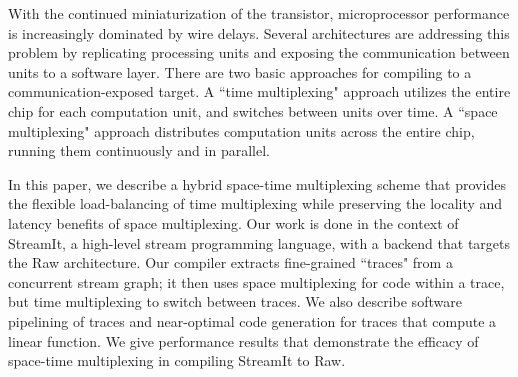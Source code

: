 With the continued miniaturization of the transistor, microprocessor
performance is increasingly dominated by wire delays.  Several
architectures are addressing this problem by replicating processing
units and exposing the communication between units to a software
layer.  There are two basic approaches for compiling to a
communication-exposed target.  A ``time multiplexing" approach utilizes
the entire chip for each computation unit, and switches between units
over time.  A ``space multiplexing" approach distributes computation
units across the entire chip, running them continuously and in
parallel.

In this paper, we describe a hybrid space-time multiplexing scheme
that provides the flexible load-balancing of time multiplexing while
preserving the locality and latency benefits of space multiplexing.
Our work is done in the context of StreamIt, a high-level stream
programming language, with a backend that targets the Raw
architecture.  Our compiler extracts fine-grained ``traces" from a
concurrent stream graph; it then uses space multiplexing for code
within a trace, but time multiplexing to switch between traces.  We
also describe software pipelining of traces and near-optimal code
generation for traces that compute a linear function.  We give
performance results that demonstrate the efficacy of space-time
multiplexing in compiling StreamIt to Raw.
